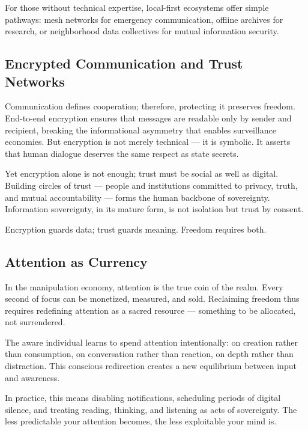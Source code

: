 \documentclass[12pt,twoside]{book}
\begin{document}
For those without technical expertise, local-first ecosystems offer simple pathways:  
mesh networks for emergency communication, offline archives for research, or neighborhood data collectives for mutual information security.

\subsection*{Encrypted Communication and Trust Networks}

Communication defines cooperation; therefore, protecting it preserves freedom.  
End-to-end encryption ensures that messages are readable only by sender and recipient, breaking the informational asymmetry that enables surveillance economies.  
But encryption is not merely technical --- it is symbolic.  
It asserts that human dialogue deserves the same respect as state secrets.  

Yet encryption alone is not enough; trust must be social as well as digital.  
Building circles of trust --- people and institutions committed to privacy, truth, and mutual accountability --- forms the human backbone of sovereignty.  
Information sovereignty, in its mature form, is not isolation but trust by consent.\\

\begin{keyidea}
Encryption guards data; trust guards meaning.  
Freedom requires both.
\end{keyidea}

\subsection*{Attention as Currency}

In the manipulation economy, attention is the true coin of the realm.  
Every second of focus can be monetized, measured, and sold.  
Reclaiming freedom thus requires redefining attention as a sacred resource --- something to be allocated, not surrendered.  

The aware individual learns to spend attention intentionally: on creation rather than consumption, on conversation rather than reaction, on depth rather than distraction.  
This conscious redirection creates a new equilibrium between input and awareness.  

In practice, this means disabling notifications, scheduling periods of digital silence, and treating reading, thinking, and listening as acts of sovereignty.  
The less predictable your attention becomes, the less exploitable your mind is.\\
\end{document}
